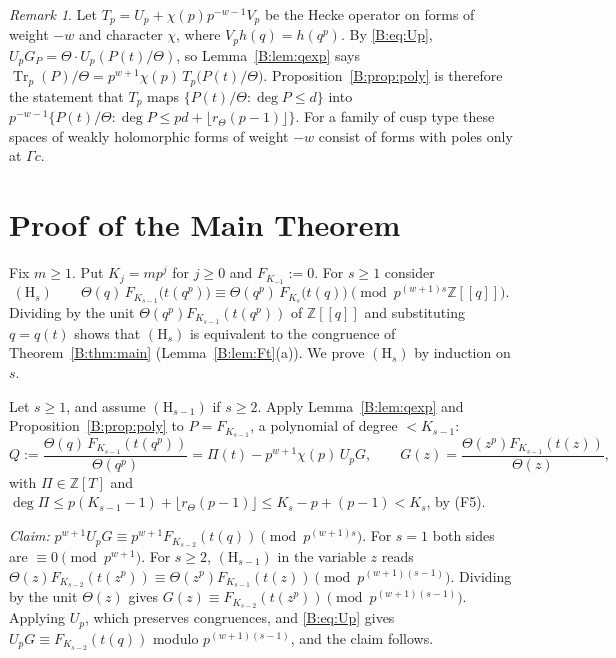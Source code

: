\documentclass[11pt,a4paper]{article}
\theoremstyle{definition}\newtheorem{definition}[theorem]{Definition}
\theoremstyle{remark}\newtheorem{remark}[theorem]{Remark}
\newcommand{\Z}{\mathbb Z}
\DeclareMathOperator{\Tr}{Tr}
\numberwithin{equation}{section}
\begin{document}
\begin{remark}\label{B:rem:hecke}
Let $T_p=U_p+\chi(p)p^{-w-1}V_p$ be the Hecke operator on forms of weight $-w$ and character
$\chi$, where $V_ph(q)=h(q^p)$. By \eqref{B:eq:Up}, $U_pG_P=\Theta\cdot U_p(P(t)/\Theta)$, so
Lemma~\ref{B:lem:qexp} says $\Tr_p(P)/\Theta=p^{w+1}\chi(p)\,T_p\bigl(P(t)/\Theta\bigr)$.
Proposition~\ref{B:prop:poly} is therefore the statement that $T_p$ maps
$\{P(t)/\Theta:\deg P\le d\}$ into $p^{-w-1}\{P(t)/\Theta:\deg P\le pd+\lfloor r_\Theta(p-1)\rfloor\}$.
For a family of cusp type these spaces of weakly holomorphic forms of weight $-w$ consist of
forms with poles only at $\Gamma c$.
\end{remark}

\section{Proof of the Main Theorem}\label{B:source-main-4}\label{B:sec:proof}
Fix $m\ge1$. Put $K_j=mp^j$ for $j\ge0$ and $F_{K_{-1}}:=0$. For $s\ge1$ consider
\[
(\mathrm H_s)\qquad \Theta(q)\,F_{K_{s-1}}\bigl(t(q^p)\bigr)\equiv\Theta(q^p)\,F_{K_s}\bigl(t(q)\bigr)\pmod{p^{(w+1)s}\Z[[q]]}.
\]
Dividing by the unit $\Theta(q^p)F_{K_{s-1}}(t(q^p))$ of $\Z[[q]]$ and substituting $q=q(t)$ shows that
$(\mathrm H_s)$ is equivalent to the congruence of Theorem~\ref{B:thm:main} (Lemma~\ref{B:lem:Ft}(a)).
We prove $(\mathrm H_s)$ by induction on $s$.

Let $s\ge1$, and assume $(\mathrm H_{s-1})$ if $s\ge2$. Apply Lemma~\ref{B:lem:qexp} and
Proposition~\ref{B:prop:poly} to $P=F_{K_{s-1}}$, a polynomial of degree $<K_{s-1}$:
\begin{equation}\label{B:eq:main}
Q:=\frac{\Theta(q)\,F_{K_{s-1}}(t(q^p))}{\Theta(q^p)}=\Pi(t)-p^{w+1}\chi(p)\,U_pG,\qquad
G(z)=\frac{\Theta(z^p)F_{K_{s-1}}(t(z))}{\Theta(z)},
\end{equation}
with $\Pi\in\Z[T]$ and $\deg\Pi\le p(K_{s-1}-1)+\lfloor r_\Theta(p-1)\rfloor\le K_s-p+(p-1)<K_s$, by (F5).

\emph{Claim:} $p^{w+1}U_pG\equiv p^{w+1}F_{K_{s-2}}(t(q))\pmod{p^{(w+1)s}}$. For $s=1$ both sides
are $\equiv0\pmod{p^{w+1}}$. For $s\ge2$, $(\mathrm H_{s-1})$ in the variable $z$ reads
$\Theta(z)F_{K_{s-2}}(t(z^p))\equiv\Theta(z^p)F_{K_{s-1}}(t(z))\pmod{p^{(w+1)(s-1)}}$. Dividing by the unit
$\Theta(z)$ gives $G(z)\equiv F_{K_{s-2}}(t(z^p))\pmod{p^{(w+1)(s-1)}}$. Applying $U_p$, which
preserves congruences, and \eqref{B:eq:Up} gives $U_pG\equiv F_{K_{s-2}}(t(q))$ modulo $p^{(w+1)(s-1)}$, and the claim follows.
\end{document}
